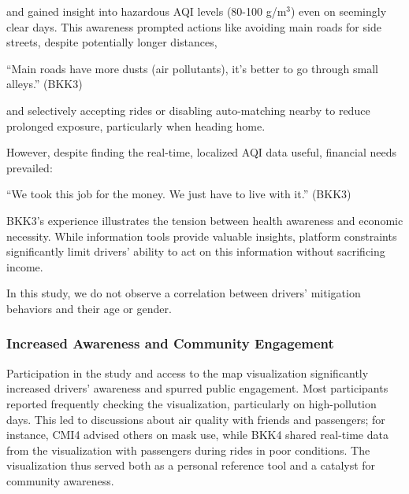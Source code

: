and gained insight into hazardous AQI levels (80-100 \textmu{}g/m$^3$) even on seemingly clear days. This awareness prompted actions like avoiding main roads for side streets, despite potentially longer distances,
\begin{quoteb}
    ``Main roads have more dusts (air pollutants), it’s better to go through small alleys.'' (BKK3)
\end{quoteb}

and selectively accepting rides or disabling auto-matching nearby to reduce prolonged exposure, particularly when heading home.


However, despite finding the real-time, localized AQI data useful, financial needs prevailed:

\begin{quoteb}
    ``We took this job for the money. We just have to live with it.'' (BKK3)
\end{quoteb}

BKK3's experience illustrates the tension between health awareness and economic necessity.
While information tools provide valuable insights, platform constraints significantly limit drivers' ability to act on this information without sacrificing income.

In this study, we do not observe a correlation between drivers' mitigation behaviors and their age or gender.

\subsubsection{Increased Awareness and Community Engagement}
Participation in the study and access to the map visualization significantly increased drivers' awareness and spurred public engagement.
Most participants reported frequently checking the visualization, particularly on high-pollution days.
This led to discussions about air quality with friends and passengers; for instance, CMI4 advised others on mask use, while BKK4 shared real-time data from the visualization with passengers during rides in poor conditions.
The visualization thus served both as a personal reference tool and a catalyst for community awareness.

